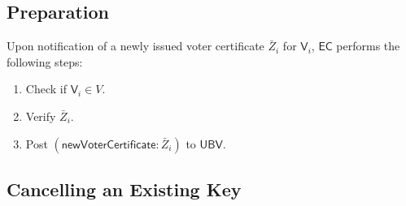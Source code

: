 \documentclass[bibtotoc,halfparskip,oneside]{scrreprt}
\newcommand{\EC}{\ensuremath{\mathsf{EC}}\xspace}
\newcommand{\UBV}{\ensuremath{\mathsf{UBV}}\xspace}
\newcommand{\Voter}[1]{\ensuremath{\mathsf{V}_{#1}}\xspace}
\begin{document}
\subsection{Preparation}

Upon notification of a newly issued voter certificate $\bar{Z}_i$ for $\Voter{i}$, \EC performs the following steps:
\begin{enumerate}
	\item Check if $\Voter{i}\in V$.
	\item Verify $\bar{Z}_i$.
	\item Post $(\mathsf{newVoterCertificate}:\bar{Z}_i)$ to \UBV. 
\end{enumerate}

\subsection{Cancelling an Existing Key}\label{cancelling}
\end{document}
